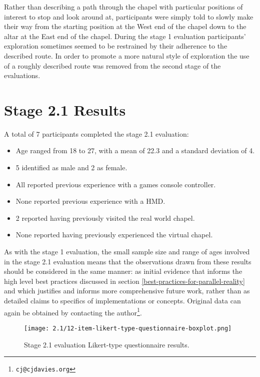 Rather than describing a path through the chapel with particular positions of interest to stop and look around at, participants were simply told to slowly make their way from the starting position at the West end of the chapel down to the altar at the East end of the chapel. During the stage 1 evaluation participants' exploration sometimes seemed to be restrained by their adherence to the described route. In order to promote a more natural style of exploration the use of a roughly described route was removed from the second stage of the evaluations.


\section{Stage 2.1 Results}

A total of 7 participants completed the stage 2.1 evaluation:
\begin{itemize}
	\item Age ranged from 18 to 27, with a mean of 22.3 and a standard deviation of 4.
	\item 5 identified as male and 2 as female.
	\item All reported previous experience with a games console controller.
	\item None reported previous experience with a HMD.
	\item 2 reported having previously visited the real world chapel.
	\item None reported having previously experienced the virtual chapel.
\end{itemize}

As with the stage 1 evaluation, the small sample size and range of ages involved in the stage 2.1 evaluation means that the observations drawn from these results should be considered in the same manner: as initial evidence that informs the high level best practices discussed in section \ref{best-practices-for-parallel-reality} and which justifies and informs more comprehensive future work, rather than as detailed claims to specifics of implementations or concepts. Original data can again be obtained by contacting the author\footnote{\texttt{cj@cjdavies.org}}.


\begin{figure}
	\begin{center}
	\texttt{[image: 2.1/12-item-likert-type-questionnaire-boxplot.png]}
	\caption{Stage 2.1 evaluation Likert-type questionnaire results.}
	\label{2-1-12-item-likert-type-questionnaire-boxplot.png}
	\end{center}
\end{figure}

